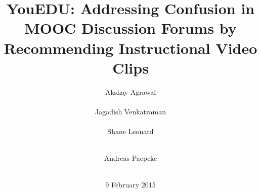 \documentclass{edm_template}
\begin{document}
\title{YouEDU: Addressing Confusion in MOOC Discussion Forums by Recommending Instructional Video Clips}
%
%
%
%
%

%
\author{
%
%
\alignauthor Akshay Agrawal \\
        \\
\alignauthor Jagadish Venkatraman \\
        \\
\alignauthor Shane Leonard \\
        \\
\and
\alignauthor Andreas Paepcke \\
        \\
} %
\date{9 February 2015}
\end{document}
